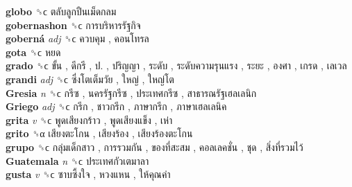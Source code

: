 \textbf{globo} ␝ϲ   ตลับลูกปืนเม็ดกลม   \\
\textbf{gobernashon} ␝ϲ   การบริหารรัฐกิจ   \\
\textbf{goberná} \emph{adj}  ␝ϲ   ควบคุม ,  คอนโทรล   \\
\textbf{gota} ␝ϲ   หยด   \\
\textbf{grado} ␝ϲ   ขั้น ,  ดีกรี ,  ป. ,  ปริญญา ,  ระดับ ,  ระดับความรุนแรง ,  ระยะ ,  องศา ,  เกรด ,  เลเวล   \\
\textbf{grandi} \emph{adj}  ␝ϲ   ซึ่งโตเต็มวัย ,  ใหญ่ ,  ใหญ่โต   \\
\textbf{Gresia} \emph{n}  ␝ϲ   กรีซ ,  นครรัฐกรีซ ,  ประเทศกรีซ ,  สาธารณรัฐเฮลเลนิก   \\
\textbf{Griego} \emph{adj}  ␝ϲ   กรีก ,  ชาวกรีก ,  ภาษากรีก ,  ภาษาเฮลเลนิค   \\
\textbf{grita} \emph{v}  ␝ϲ   พูดเสียงกร้าว ,  พูดเสียงแข็ง ,  เห่า   \\
\textbf{grito} ␝α   เสียงตะโกน ,  เสียงร้อง ,  เสียงร้องตะโกน   \\
\textbf{grupo} ␝ϲ   กลุ่มเด็กสาว ,  การรวมกัน ,  ของที่สะสม ,  คอลเลคชั่น ,  ชุด ,  สิ่งที่รวมไว้   \\
\textbf{Guatemala} \emph{n}  ␝ϲ   ประเทศกัวเตมาลา   \\
\textbf{gusta} \emph{v}  ␝ϲ   ซาบซึ้งใจ ,  หวงแหน ,  ให้คุณค่า   \\
